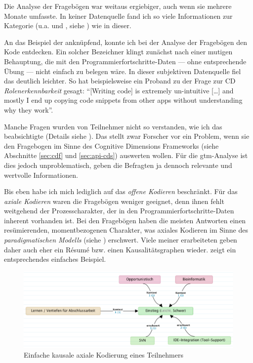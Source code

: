 Die Analyse der Fragebögen war weitaus ergiebiger, auch wenn sie mehrere Monate umfasste. In keiner Datenquelle fand ich so viele Informationen zur Kategorie  (u.a.  und , siehe \pageref{sec:gt-funktionsbezogene-probleme}) wie in dieser.

An das Beispiel der  anknüpfend, konnte ich bei der Analyse der Fragebögen den Kode  entdecken. Ein solcher Bezeichner klingt zunächst nach einer mutigen Behauptung, die mit den Programmierfortschritte-Daten --- ohne entsprechende Übung --- nicht einfach zu belegen wäre. In dieser subjektiven Datenquelle fiel das deutlich leichter. So hat beispielsweise ein Proband zu der Frage zur CD \textit{Rolenerkennbarkeit} gesagt: ``[Writing code] is extremely un-intuitive [\dots] and mostly I end up copying code snippets from other apps without understanding why they work''.

Manche Fragen wurden von Teilnehmer nicht so verstanden, wie ich das beabsichtigte (Details siehe 
). Das stellt zwar Forscher vor ein Problem, wenn sie den Fragebogen im Sinne des Cognitive Dimensions Frameworks (siehe Abschnitte \ref{sec:cdf} und \ref{sec:api-cds}) auswerten wollen. Für die \gls{gtm}-Analyse ist dies jedoch unproblematisch, geben die Befragten ja dennoch relevante und wertvolle Informationen.

Bis eben habe ich mich lediglich auf das \textit{offene Kodieren} beschränkt. Für das \textit{axiale Kodieren} waren die Fragebögen weniger geeignet, denn ihnen fehlt weitgehend der Prozesscharakter, der in den Programmierfortschritte-Daten inherent vorhanden ist. Bei den Fragebögen haben die meisten Antworten einen resümierenden, momentbezogenen Charakter, was axiales Kodieren im Sinne des \textit{paradigmatischen Modells} (siehe ) erschwert. Viele meiner erarbeiteten \textit{} geben daher auch eher ein Résumé bzw. einen Kausalitätsgraphen wieder.  zeigt ein entsprechendes einfaches Beispiel.

\begin{figure}
\begin{minipage}{\textwidth}
  \centering
    \includegraphics[width=0.75\linewidth]{Figures/research/cdf-eb6d.png}
  \caption[Kausale axiale Kodierung]{Einfache kausale axiale Kodierung eines Teilnehmers}
  \label{fig:research-cdf-eb6d}
\end{minipage}
\end{figure}

